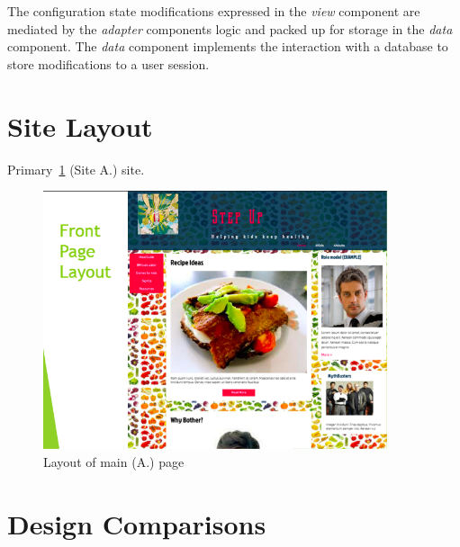 \documentclass[letterpaper,twoside,12pt]{article}
\begin{document}
The configuration state modifications expressed in the \emph{view} component
are mediated by the \emph{adapter} components logic and packed up for storage
in the \emph{data} component. The \emph{data} component implements the
interaction with a database to store modifications to a user session.

\section{Site Layout}

Primary~\cref{fig:layout-mainpage} (Site A.) site.

\begin{figure}[ht!]
  \centering
  \includegraphics[width=0.9\textwidth]{assets/jpg/layout_mainpage}
  \caption{Layout of main (A.) page}
  \label{fig:layout-mainpage}
\end{figure}
\FloatBarrier


\section{Design Comparisons}
\end{document}
